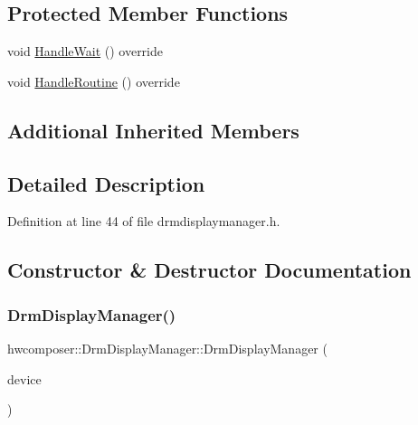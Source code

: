 \subsection*{Protected Member Functions}
\begin{DoxyCompactItemize}
\item 
void \mbox{\hyperlink{classhwcomposer_1_1DrmDisplayManager_abcf8a2a9394d722a58b79060f9f51dbc}{Handle\+Wait}} () override
\item 
void \mbox{\hyperlink{classhwcomposer_1_1DrmDisplayManager_a3f29044c35ff76edb4718ed19f340794}{Handle\+Routine}} () override
\end{DoxyCompactItemize}
\subsection*{Additional Inherited Members}


\subsection{Detailed Description}


Definition at line 44 of file drmdisplaymanager.\+h.



\subsection{Constructor \& Destructor Documentation}
\mbox{\label{classhwcomposer_1_1DrmDisplayManager_a7fa49119fbf2a4aece3a9e299e9a9919}} 
\subsubsection{\texorpdfstring{Drm\+Display\+Manager()}{DrmDisplayManager()}}
{\footnotesize\ttfamily hwcomposer\+::\+Drm\+Display\+Manager\+::\+Drm\+Display\+Manager (\begin{DoxyParamCaption}\item[{\mbox{\hyperlink{classhwcomposer_1_1GpuDevice}{Gpu\+Device}} $\ast$}]{device }\end{DoxyParamCaption})}



